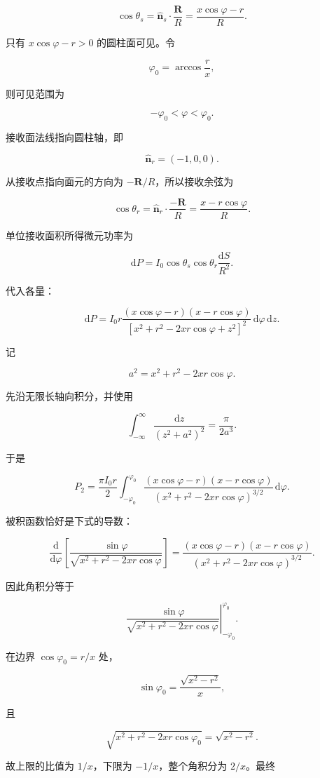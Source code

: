 \documentclass[12pt,a4paper,UTF8]{ctexart}
\begin{document}
\[
\cos\theta_s
=\hat{\bm n}_s\cdot\frac{\bm R}{R}
=\frac{x\cos\varphi-r}{R}.
\]

只有 \(x\cos\varphi-r>0\) 的圆柱面可见。令

\[\varphi_0=\arccos\frac rx,\]

则可见范围为

\[-\varphi_0<\varphi<\varphi_0.\]

接收面法线指向圆柱轴，即

\[\hat{\bm n}_r=(-1,0,0).\]

从接收点指向面元的方向为 \(-\bm R/R\)，所以接收余弦为

\[
\cos\theta_r
=\hat{\bm n}_r\cdot\frac{-\bm R}{R}
=\frac{x-r\cos\varphi}{R}.
\]

单位接收面积所得微元功率为

\[
\mathrm{d}P=I_0\cos\theta_s\cos\theta_r
\frac{\mathrm{d}S}{R^2}.
\]

代入各量：

\[
\mathrm{d}P=I_0r
\frac{(x\cos\varphi-r)(x-r\cos\varphi)}
{[x^2+r^2-2xr\cos\varphi+z^2]^2}
\,\mathrm{d}\varphi\,\mathrm{d}z.
\]

记

\[a^2=x^2+r^2-2xr\cos\varphi.\]

先沿无限长轴向积分，并使用

\[
\int_{-\infty}^{\infty}
\frac{\mathrm{d}z}{(z^2+a^2)^2}
=\frac{\pi}{2a^3}.
\]

于是

\[
P_2=\frac{\pi I_0r}{2}
\int_{-\varphi_0}^{\varphi_0}
\frac{(x\cos\varphi-r)(x-r\cos\varphi)}
{(x^2+r^2-2xr\cos\varphi)^{3/2}}\,\mathrm{d}\varphi.
\]

被积函数恰好是下式的导数：

\[
\frac{\mathrm{d}}{\mathrm{d}\varphi}
\left[
\frac{\sin\varphi}
{\sqrt{x^2+r^2-2xr\cos\varphi}}
\right]
=\frac{(x\cos\varphi-r)(x-r\cos\varphi)}
{(x^2+r^2-2xr\cos\varphi)^{3/2}}.
\]

因此角积分等于

\[
\left.
\frac{\sin\varphi}
{\sqrt{x^2+r^2-2xr\cos\varphi}}
\right|_{-\varphi_0}^{\varphi_0}.
\]

在边界 \(\cos\varphi_0=r/x\) 处，

\[
\sin\varphi_0=\frac{\sqrt{x^2-r^2}}{x},
\]

且

\[
\sqrt{x^2+r^2-2xr\cos\varphi_0}
=\sqrt{x^2-r^2}.
\]

故上限的比值为 \(1/x\)，下限为 \(-1/x\)，整个角积分为 \(2/x\)。最终
\end{document}
